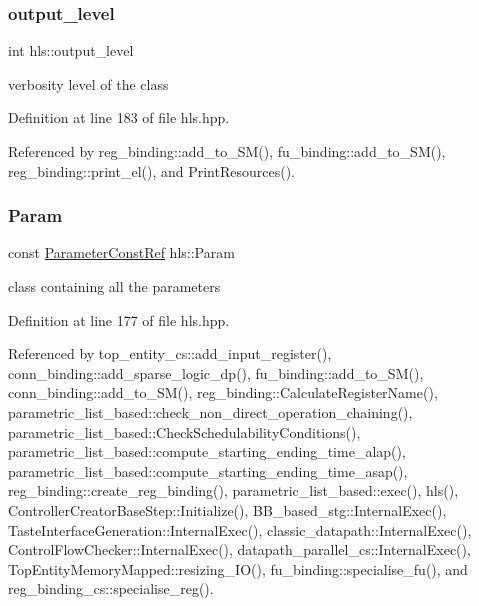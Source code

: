 \mbox{\label{classhls_ad0053ca147e2bc74a7dd81a55f35efd5}} 
\subsubsection{\texorpdfstring{output\+\_\+level}{output\_level}}
{\footnotesize\ttfamily int hls\+::output\+\_\+level}



verbosity level of the class 



Definition at line 183 of file hls.\+hpp.



Referenced by reg\+\_\+binding\+::add\+\_\+to\+\_\+\+S\+M(), fu\+\_\+binding\+::add\+\_\+to\+\_\+\+S\+M(), reg\+\_\+binding\+::print\+\_\+el(), and Print\+Resources().

\mbox{\label{classhls_a97e43df586a38ff6051d75c21560ff48}} 
\subsubsection{\texorpdfstring{Param}{Param}}
{\footnotesize\ttfamily const \hyperlink{Parameter_8hpp_a37841774a6fcb479b597fdf8955eb4ea}{Parameter\+Const\+Ref} hls\+::\+Param}



class containing all the parameters 



Definition at line 177 of file hls.\+hpp.



Referenced by top\+\_\+entity\+\_\+cs\+::add\+\_\+input\+\_\+register(), conn\+\_\+binding\+::add\+\_\+sparse\+\_\+logic\+\_\+dp(), fu\+\_\+binding\+::add\+\_\+to\+\_\+\+S\+M(), conn\+\_\+binding\+::add\+\_\+to\+\_\+\+S\+M(), reg\+\_\+binding\+::\+Calculate\+Register\+Name(), parametric\+\_\+list\+\_\+based\+::check\+\_\+non\+\_\+direct\+\_\+operation\+\_\+chaining(), parametric\+\_\+list\+\_\+based\+::\+Check\+Schedulability\+Conditions(), parametric\+\_\+list\+\_\+based\+::compute\+\_\+starting\+\_\+ending\+\_\+time\+\_\+alap(), parametric\+\_\+list\+\_\+based\+::compute\+\_\+starting\+\_\+ending\+\_\+time\+\_\+asap(), reg\+\_\+binding\+::create\+\_\+reg\+\_\+binding(), parametric\+\_\+list\+\_\+based\+::exec(), hls(), Controller\+Creator\+Base\+Step\+::\+Initialize(), B\+B\+\_\+based\+\_\+stg\+::\+Internal\+Exec(), Taste\+Interface\+Generation\+::\+Internal\+Exec(), classic\+\_\+datapath\+::\+Internal\+Exec(), Control\+Flow\+Checker\+::\+Internal\+Exec(), datapath\+\_\+parallel\+\_\+cs\+::\+Internal\+Exec(), Top\+Entity\+Memory\+Mapped\+::resizing\+\_\+\+I\+O(), fu\+\_\+binding\+::specialise\+\_\+fu(), and reg\+\_\+binding\+\_\+cs\+::specialise\+\_\+reg().

